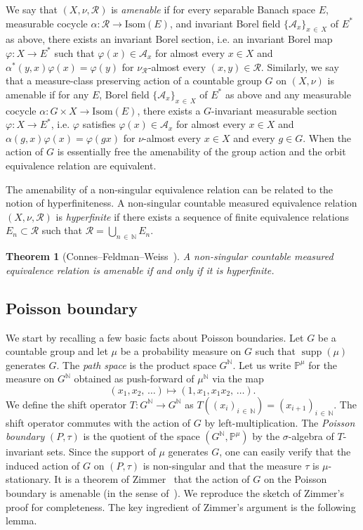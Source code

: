 \documentclass[10pt]{amsart}
\newtheorem{theo}{Theorem}[section]
\theoremstyle{definition}\newtheorem{defi}[theo]{Definition}\newtheorem{rema}[theo]{Remark}\newtheorem{exam}[theo]{Example}\newtheorem{exem}[theo]{Example}\newtheorem{nota}[theo]{Notation}
\DeclareMathOperator{\supp}{supp}
\newcommand{\bbN}{\mathbb{N}}
\newcommand{\bbP}{\mathbb{P}}
\newcommand{\calR}{\mathcal{R}}
\newcommand{\calA}{\mathcal{A}}
\newcommand{\Isom}{\mathrm{Isom}}
\begin{document}
We say that $(X,\nu,\calR)$ is \emph{amenable} if for every separable Banach space $E$, measurable cocycle $\alpha\colon \calR\to \Isom(E)$, and invariant Borel field $\{\calA_x\}_{x\,\in\,X}$ of $E^*$ as above, there exists an invariant Borel section, i.e. an invariant Borel map $\varphi\colon X\to E^*$ such that $\varphi(x)\in \calA_x$ for almost every $x\in X$ and $\alpha^*(y,x)\varphi(x)=\varphi(y)$ for $\nu_{\calR}$-almost every $(x,y)\in\calR$. Similarly, we say that a measure-class preserving action of a countable group $G$ on $(X,\nu)$ is amenable if for any $E$, Borel field $\{\calA_x\}_{x\,\in\,X}$ of $E^*$ as above and any measurable cocycle $\alpha\colon G\times X \to \Isom(E)$, there exists a $G$-invariant measurable section $\varphi\colon X\to E^*$, i.e. $\varphi$ satisfies $\varphi(x)\in \calA_x$ for almost every $x\in X$ and $\alpha(g,x)\varphi(x)=\varphi(gx) $ for $\nu$-almost every $x\in X$ and every $g\in G$. When the action of $G$ is essentially free the amenability of the group action and the orbit equivalence relation are equivalent.

The amenability of a non-singular equivalence relation can be related to the notion of hyperfiniteness. A non-singular countable measured equivalence relation $(X,\nu,\calR)$ is \emph{hyperfinite} if there exists a sequence of finite equivalence relations $E_n\subset \calR$ such that $\calR=\bigcup_{n\,\in\,\bbN}E_n.$


\begin{theo}[{Connes--Feldman--Weiss~\cite{ConnesFeldmanWeiss}}]\label{thm:CFW}
A non-singular countable measured equivalence relation is amenable if and only if it is hyperfinite.
\end{theo}

\subsection{Poisson boundary}

We start by recalling a few basic facts about Poisson boundaries. Let $G$ be a countable group and let $\mu$ be a probability measure on $G$ such that $\supp(\mu)$ generates $G$. The \emph{path space} is the product space $G^\bbN$. Let us write $\bbP^\mu$ for the measure on $G^\bbN$ obtained as push-forward of $\mu^\bbN$ via the map
\[
(x_1,x_2,\,\ldots)\mapsto (1, x_1,x_1x_2,\,\ldots).
\]
We define the shift operator $T:G^\bbN\to G^\bbN$ as $T((x_i)_{i\,\in\,\bbN})=(x_{i+1})_{i\,\in\,\bbN}$. The shift operator commutes with the action of $G$ by left-multiplication. The \emph{Poisson boundary} $(P,\tau)$ is the quotient of the space $(G^\bbN,\bbP^\mu)$ by the $\sigma$-algebra of $T$-invariant sets. Since the support of $\mu$ generates $G$, one can easily verify that the induced action of $G$ on $(P,\tau)$ is non-singular and that the measure $\tau$ is $\mu$-stationary. It is a theorem of Zimmer~\cite{Zimmer78} that the action of $G$ on the Poisson boundary is amenable (in the sense of~\cite{Zimmer78}). We reproduce the sketch of Zimmer's proof for completeness. The key ingredient of Zimmer's argument is the following lemma.
\end{document}
